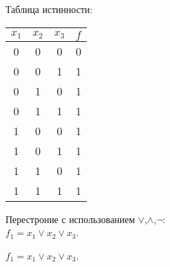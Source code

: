 \begin{solution}
Таблица истинности: \\
\begin{center}
 \begin{tabular}{| c c c | c |}
  \hline	
 $ x_1$ & $x_2$ & $x_3$ & $f$ \\ [0,5 ex]
  \hline\hline
  0 & 0 & 0 & 0\\ [1,5 ex]
  \hline
  0 & 0 & 1 & 1 \\ [1,5 ex]
  \hline
  0 & 1 & 0 & 1 \\ [1,5 ex]
  \hline
  0 & 1 & 1 & 1 \\ [1,5 ex]
  \hline
  1 & 0 & 0 & 1 \\ [1,5 ex]
  \hline
  1 & 0 & 1 & 1 \\ [1,5 ex]
  \hline
  1 & 1 & 0 & 1 \\ [1,5 ex]
  \hline
  1 & 1 & 1 & 1 \\ [1,5 ex]
  \hline
 \end{tabular}
 \end{center}
Перестроние с использованием  $\vee$,$\wedge$,$\neg$: \\$f_1=x_1\vee x_2\vee x_3$.
\end{solution}

\begin{answer}
$f_1=x_1\vee x_2\vee x_3$.
\end{answer}